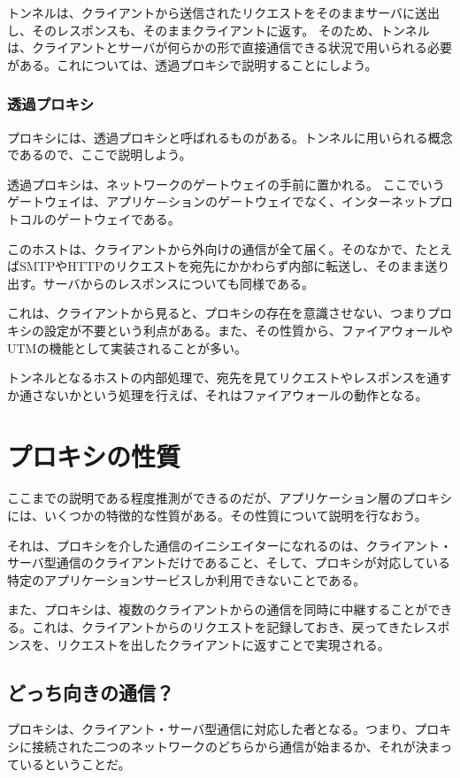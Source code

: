 トンネルは、クライアントから送信されたリクエストをそのままサーバに送出し、そのレスポンスも、そのままクライアントに返す。
そのため、トンネルは、クライアントとサーバが何らかの形で直接通信できる状況で用いられる必要がある。これについては、透過プロキシで説明することにしよう。

\subsubsection{透過プロキシ}
プロキシには、透過プロキシと呼ばれるものがある。トンネルに用いられる概念であるので、ここで説明しよう。

透過プロキシは、ネットワークのゲートウェイの手前に置かれる。
ここでいうゲートウェイは、アプリケ－ションのゲートウェイでなく、インターネットプロトコルのゲートウェイである。

このホストは、クライアントから外向けの通信が全て届く。そのなかで、たとえばSMTPやHTTPのリクエストを宛先にかかわらず内部に転送し、そのまま送り出す。サーバからのレスポンスについても同様である。

これは、クライアントから見ると、プロキシの存在を意識させない、つまりプロキシの設定が不要という利点がある。また、その性質から、ファイアウォールやUTMの機能として実装されることが多い。

トンネルとなるホストの内部処理で、宛先を見てリクエストやレスポンスを通すか通さないかという処理を行えば、それはファイアウォールの動作となる。

\section{プロキシの性質}
ここまでの説明である程度推測ができるのだが、アプリケーション層のプロキシには、いくつかの特徴的な性質がある。その性質について説明を行なおう。

それは、プロキシを介した通信のイニシエイターになれるのは、クライアント・サーバ型通信のクライアントだけであること、そして、プロキシが対応している特定のアプリケーションサービスしか利用できないことである。

また、プロキシは、複数のクライアントからの通信を同時に中継することができる。これは、クライアントからのリクエストを記録しておき、戻ってきたレスポンスを、リクエストを出したクライアントに返すことで実現される。

\subsection{どっち向きの通信？}
プロキシは、クライアント・サーバ型通信に対応した者となる。つまり、プロキシに接続された二つのネットワークのどちらから通信が始まるか、それが決まっているということだ。

